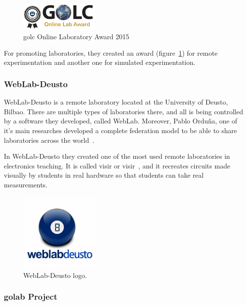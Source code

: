 \begin{figure}[!htbp]
	\centering
	\includegraphics[width=0.35\textwidth]{fig/golc-award}
	\caption{\acrshort{golc} Online Laboratory Award 2015}\label{fig:golc_award}
\end{figure}

For promoting laboratories, they created an award (figure~\ref{fig:golc_award}) for remote
experimentation and another one for simulated experimentation.

\subsubsection{WebLab-Deusto}

WebLab-Deusto is a remote laboratory located at the University of Deusto, Bilbao. There are multiple
types of laboratories there, and all is being controlled by a software they developed, called
WebLab. Moreover, Pablo Orduña, one of it's main researches developed a complete federation model
to be able to share laboratories across the world~\cite{porduna_phd}.

In WebLab-Deusto they created one of the most used remote laboratories in electronics teaching. It
is called \acrlong{visir} or \acrshort{visir}~\cite{visir}, and it recreates circuits made visually
by students in real hardware so that students can take real measurements.

\begin{figure}[!htbp]
	\centering
	\includegraphics[width=0.35\textwidth]{fig/weblab}
	\caption{WebLab-Deusto logo.}
\end{figure}

\subsubsection{\acrshort{golab} Project}

